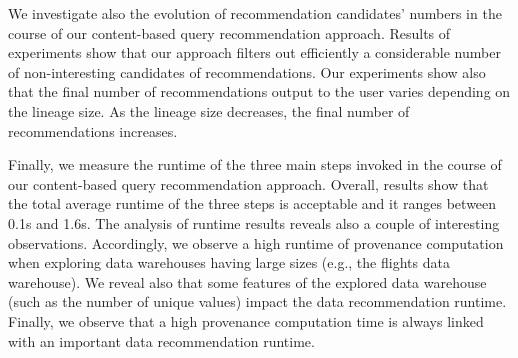 We investigate also the evolution of recommendation candidates' numbers in the course of our content-based query recommendation approach. Results of experiments show that our approach filters out efficiently a considerable number of non-interesting candidates of recommendations. Our experiments show also that the final number of recommendations output to the user varies depending on the lineage size. As the lineage size decreases, the final number of recommendations increases.

Finally, we measure the runtime of the three main steps invoked in the course of our content-based query recommendation approach. 
Overall, results show that the total average runtime of the three steps is acceptable and it ranges between 0.1s and 1.6s.
The analysis of runtime results reveals also a couple of interesting observations.
 Accordingly, we observe a high runtime of provenance computation when exploring data warehouses having large sizes (e.g., the flights data warehouse). 
 We reveal also that some features of the explored data warehouse (such as the number of unique values) impact the data recommendation runtime. 
Finally, we observe that a high provenance computation time is always linked with an important data recommendation runtime.






